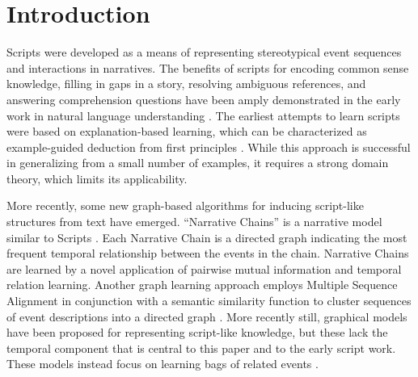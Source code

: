 \documentclass[letterpaper]{article}
\begin{document}
\section{Introduction}
Scripts were developed as a means of representing stereotypical event sequences and interactions in narratives. %
The benefits of scripts for encoding common sense knowledge,
filling in gaps in a story, resolving
ambiguous references, and answering comprehension
questions have been amply demonstrated in the early work
in natural language understanding \cite{schank1977scripts}.
The earliest attempts to learn scripts were based on
 explanation-based learning, which can be characterized as example-guided deduction from first principles \cite{dejong1981,dejong1986EBL}. %
While this approach is successful in generalizing from a small number of examples, it requires a strong domain theory, which limits its applicability.

More recently, some new graph-based algorithms for inducing script-like structures from text have emerged.  ``Narrative Chains'' is a narrative model similar to Scripts \cite{chambers2008unsupervised}. Each Narrative Chain is a directed graph indicating the most frequent temporal relationship between the events in the chain. Narrative Chains are learned by a novel application of pairwise mutual information and temporal relation learning. %
Another graph learning approach employs Multiple Sequence Alignment in conjunction with a semantic similarity function to cluster sequences of event descriptions into a directed graph \cite{regneri2010learning}. More recently still, graphical models have been proposed for representing script-like knowledge, but these lack the temporal component that is central to this paper and to the early script work. These models instead focus on learning bags of related events \cite{chambers2013event,kit2013probabilistic}.
\end{document}
